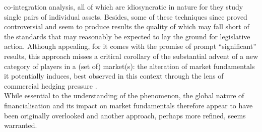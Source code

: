 \documentclass[
  authoryear,
  preprint,
  3p]{elsarticle}
\begin{document}
co-integration analysis, all of which are idiosyncratic in nature for
they study single pairs of individual assets. Besides, some of these
techniques since proved controversial and seem to produce results the
quality of which may fall short of the standards that may reasonably be
expected to lay the ground for legislative action. Although appealing,
for it comes with the promise of prompt ``significant'' results, this
approach misses a critical corollary of the substantial advent of a new
category of players in a (set of) market(s): the alteration of market
fundamentals it potentially induces, best observed in this context
through the lens of commercial hedging pressure
\citep{keynes_treatise_1930, hicks_value_1939}.\\
While essential to the understanding of the phenomenon, the global
nature of financialisation and its impact on market fundamentals
therefore appear to have been originally overlooked and another
approach, perhaps more refined, seems warranted.

\medskip
\end{document}
